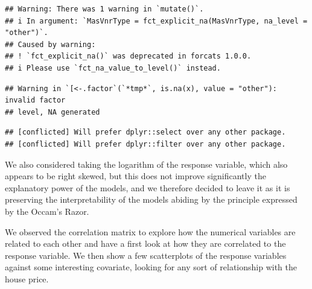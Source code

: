 \documentclass[
]{article}
\begin{document}
\begin{verbatim}
## Warning: There was 1 warning in `mutate()`.
## i In argument: `MasVnrType = fct_explicit_na(MasVnrType, na_level = "other")`.
## Caused by warning:
## ! `fct_explicit_na()` was deprecated in forcats 1.0.0.
## i Please use `fct_na_value_to_level()` instead.
\end{verbatim}

\begin{verbatim}
## Warning in `[<-.factor`(`*tmp*`, is.na(x), value = "other"): invalid factor
## level, NA generated
\end{verbatim}

\begin{verbatim}
## [conflicted] Will prefer dplyr::select over any other package.
## [conflicted] Will prefer dplyr::filter over any other package.
\end{verbatim}

We also considered taking the logarithm of the response variable, which
also appears to be right skewed, but this does not improve significantly
the explanatory power of the models, and we therefore decided to leave
it as it is preserving the interpretability of the models abiding by the
principle expressed by the Occam's Razor.

We observed the correlation matrix to explore how the numerical
variables are related to each other and have a first look at how they
are correlated to the response variable. We then show a few scatterplots
of the response variables against some interesting covariate, looking
for any sort of relationship with the house price.
\end{document}

